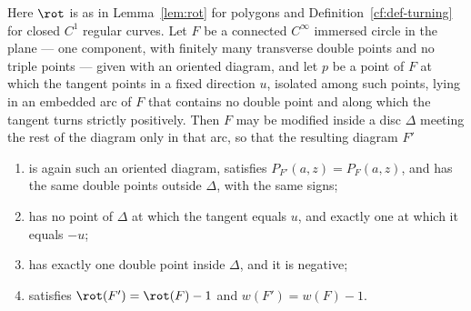 \begin{lemma}\label{cf:lem-curl}\leanok
Here $\rot$ is as in Lemma~\ref{lem:rot} for polygons and
Definition~\ref{cf:def-turning} for closed $C^1$ regular curves.
Let $F$ be a connected $C^\infty$ immersed circle in the plane --- one
component, with finitely many transverse double points and no triple points ---
given with an oriented diagram, and let $p$ be a point of $F$ at which the
tangent points in a fixed direction $u$, isolated among such points, lying in
an embedded arc of $F$ that contains no double point and along which the tangent
turns strictly positively. Then $F$ may be modified inside a disc $\Delta$
meeting the rest of the diagram only in that arc, so that the resulting
diagram $F'$
\begin{enumerate}
\item[(i)] is again such an oriented diagram, satisfies
$P_{F'}(a,z)=P_F(a,z)$, and has the same double points outside $\Delta$, with
the same signs;
\item[(ii)] has no point of $\Delta$ at which the tangent equals $u$, and exactly
one at which it equals $-u$;
\item[(iii)] has exactly one double point inside $\Delta$, and it is negative;
\item[(iv)] satisfies $\rot(F')=\rot(F)-1$ and $w(F')=w(F)-1$.
\end{enumerate}

\end{lemma}
